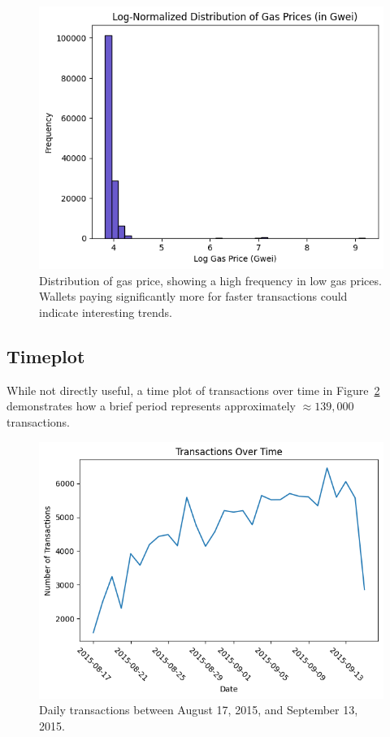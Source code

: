 \documentclass[sigconf]{acmart}
\begin{document}
\begin{figure}[H]
    \centering
    \includegraphics[width=0.8\linewidth]{M4-normalized-distro-gas-price.png}
    \caption{Distribution of gas price, showing a high frequency in low gas prices. Wallets paying significantly more for faster transactions could indicate interesting trends.}
    \label{fig:gasPrice}
\end{figure}

\subsection{Timeplot}
While not directly useful, a time plot of transactions over time in Figure~\ref{fig:timePlot} demonstrates how a brief period represents approximately \( \approx 139,000 \) transactions.

\begin{figure}[H]
    \centering
    \includegraphics[width=0.8\linewidth]{M4-transactions-timeplot.png}
    \caption{Daily transactions between August 17, 2015, and September 13, 2015.}
    \label{fig:timePlot}
\end{figure}
\end{document}
